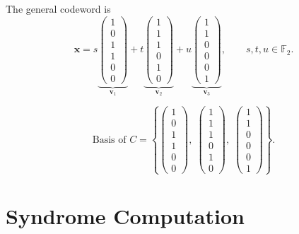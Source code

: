 The general codeword is
\[
    \mathbf{x}
    = s\underbrace{\begin{pmatrix}1\\0\\1\\1\\0\\0\end{pmatrix}}_{\mathbf{v}_1}
    + t\underbrace{\begin{pmatrix}1\\1\\1\\0\\1\\0\end{pmatrix}}_{\mathbf{v}_2}
    + u\underbrace{\begin{pmatrix}1\\1\\0\\0\\0\\1\end{pmatrix}}_{\mathbf{v}_3},
    \qquad s, t, u \in \mathbb{F}_2.
\]

\[
    \text{Basis of } C = \left\{
    \begin{pmatrix}1\\0\\1\\1\\0\\0\end{pmatrix},\;
    \begin{pmatrix}1\\1\\1\\0\\1\\0\end{pmatrix},\;
    \begin{pmatrix}1\\1\\0\\0\\0\\1\end{pmatrix}
    \right\}.
\]

\section{Syndrome Computation}

